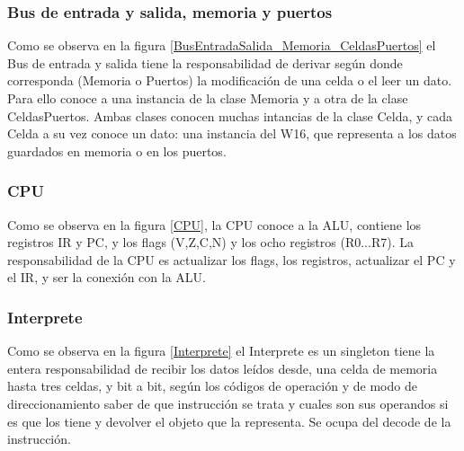 
\subsubsection{Bus de entrada y salida, memoria y puertos}
Como se observa en la figura \ref{BusEntradaSalida_Memoria_CeldasPuertos} el Bus de entrada y salida tiene la responsabilidad de derivar según donde corresponda (Memoria o Puertos) la modificación de una celda o el leer un dato. Para ello conoce a una instancia de la clase Memoria y a otra de la clase CeldasPuertos. 
Ambas clases conocen muchas intancias de la clase Celda, y cada Celda a su vez conoce un dato: una instancia del W16, que representa a los datos guardados en memoria o en los puertos.  


\subsubsection{CPU}
Como se observa en la figura \ref{CPU}, la CPU conoce a la ALU, contiene los registros IR y PC, y los flags (V,Z,C,N) y los ocho registros (R0...R7). La responsabilidad de la CPU es actualizar los flags, los registros, actualizar el PC y el IR, y ser la conexión con la ALU.


\subsubsection{Interprete}
Como se observa en la figura \ref{Interprete} el Interprete es un singleton tiene la entera responsabilidad de recibir los datos leídos desde, una celda de memoria hasta tres celdas, y bit a bit, según los códigos de operación y de modo de direccionamiento saber de que instrucción se trata y cuales son sus operandos si es que los tiene y devolver el objeto que la representa. Se ocupa del decode de la instrucción.


